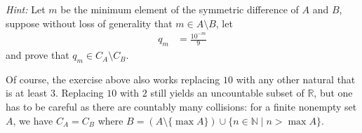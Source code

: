 \documentclass[11pt]{article}
\newcommand{\bbN}{\mathbb{N}}
\newcommand{\bbR}{\mathbb{R}}
\newcommand{\com}[1]{{\color{blue} #1}} %
\theoremstyle{definition}
\numberwithin{equation}{subsection}
\begin{document}
\begin{enumerate}
\begin{enumerate}
    \emph{Hint:} Let $m$ be the minimum element of the symmetric difference of $A$ and $B$, suppose
    without loss of generality that $m\in A\setminus B$, let
    \begin{align*}
      q_m & = \frac{10^{-m}}{9}
    \end{align*}
    and prove that $q_m\in C_A\setminus C_B$.
  \end{enumerate}
  \com{Of course, the exercise above also works replacing $10$ with any other natural that is at
    least $3$. Replacing $10$ with $2$ still yields an uncountable subset of $\bbR$, but one has to
    be careful as there are countably many collisions: for a finite nonempty set $A$, we have $C_A =
    C_B$ where $B = (A\setminus\{\max A\})\cup\{n\in\bbN \mid n > \max A\}$.}
	
	





\end{enumerate}
\end{document}
